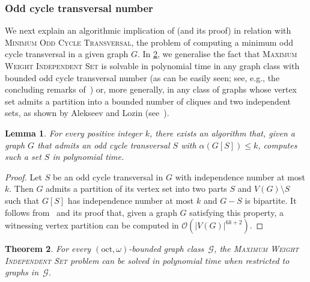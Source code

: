 \documentclass[11pt]{article}
\newcommand{\octt}{\mathrm{oct}}
\theoremstyle{plain}
\newtheorem{theorem}{Theorem}[section]
\newtheorem{lemma}[theorem]{Lemma}
\theoremstyle{definition}
\theoremstyle{remark}
\numberwithin{equation}{section}
\begin{document}
\subsubsection{Odd cycle transversal number}

We next explain an algorithmic implication of  (and its proof) in relation with \textsc{Minimum Odd Cycle Transversal}, the problem of computing a minimum odd cycle transversal in a given graph $G$.
In \cref{thm:MWIS-oct}, we generalise the fact that \textsc{Maximum Weight Independent Set} is solvable in polynomial time in any graph class with bounded odd cycle transversal number (as can be easily seen; see, e.g., the concluding remarks of~\cite{MR3197780}) or, more generally, in any class of graphs whose vertex set admits a partition into a bounded number of cliques and two independent sets, as shown by Alekseev and Lozin (see~\cite{ALEKSEEV2003351}).


\begin{lemma}\label{lem:MWIS-finding-oct}
For every positive integer $k$, there exists an algorithm that, given a graph $G$ that admits an odd cycle transversal $S$ with $\alpha(G[S])\le k$, computes such a set $S$ in polynomial time.
\end{lemma}

\begin{proof}
Let $S$ be an odd cycle transversal in $G$ with independence number at most $k$. Then $G$ admits a partition of its vertex set into two parts $S$ and $V(G) \setminus S$ such that $G[S]$ has independence number at most $k$ and $G-S$ is bipartite. 
It follows from~\cite[Lemma~8]{ALEKSEEV2003351} and its proof that, given a graph $G$ satisfying this property, a witnessing vertex partition  can be computed in $\mathcal{O}(|V(G)|^{6k+2})$.
\end{proof}


\begin{theorem}\label{thm:MWIS-oct}
For every $(\octt,\omega)$-bounded graph class~$\mathcal{G}$, the \textsc{Maximum Weight Independent Set} problem can be solved in polynomial time when restricted to graphs in~$\mathcal{G}$.

\end{theorem}
\end{document}
